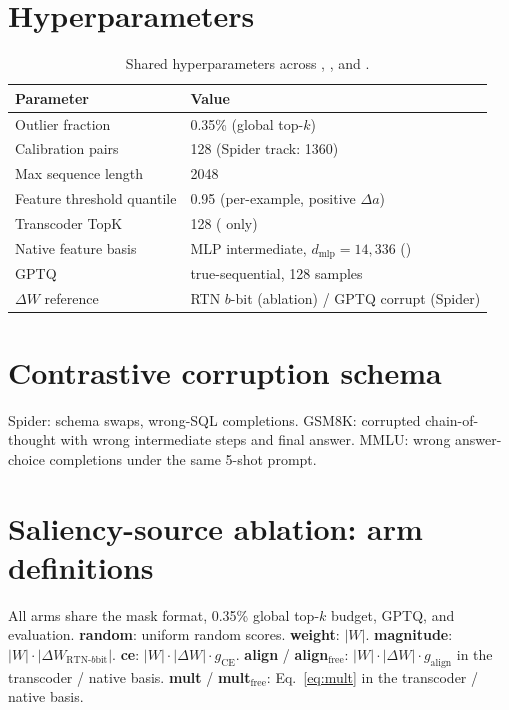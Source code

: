 \section{Hyperparameters}
\label{app:hyperparams}

\begin{table}[h]
\centering
\caption{Shared hyperparameters across \baseline{}, \method{}, and
\methodfree{}.}
\begin{tabular}{ll}
\toprule
Parameter & Value \\
\midrule
Outlier fraction & 0.35\% (global top-$k$) \\
Calibration pairs & 128 (Spider track: 1360) \\
Max sequence length & 2048 \\
Feature threshold quantile & 0.95 (per-example, positive $\Delta a$) \\
Transcoder TopK & 128 (\method{} only) \\
Native feature basis & MLP intermediate, $d_{\text{mlp}}{=}14{,}336$ (\methodfree{}) \\
GPTQ & true-sequential, 128 samples \\
$\Delta W$ reference & RTN $b$-bit (ablation) / GPTQ corrupt (Spider) \\
\bottomrule
\end{tabular}
\end{table}

\section{Contrastive corruption schema}
\label{app:corruptions}
Spider: schema swaps, wrong-SQL completions. GSM8K: corrupted chain-of-thought
with wrong intermediate steps and final answer. MMLU: wrong answer-choice
completions under the same 5-shot prompt.

\section{Saliency-source ablation: arm definitions}
\label{app:arms}
All arms share the mask format, 0.35\% global top-$k$ budget, GPTQ, and
evaluation. \textbf{random}: uniform random scores. \textbf{weight}: $|W|$.
\textbf{magnitude}: $|W|\cdot|\Delta W_{\text{RTN-}b\text{bit}}|$.
\textbf{ce}: $|W|\cdot|\Delta W|\cdot g_{\text{CE}}$. \textbf{align} /
\textbf{align$_{\text{free}}$}: $|W|\cdot|\Delta W|\cdot g_{\text{align}}$ in
the transcoder / native basis. \textbf{mult} / \textbf{mult$_{\text{free}}$}:
Eq.~\ref{eq:mult} in the transcoder / native basis.

